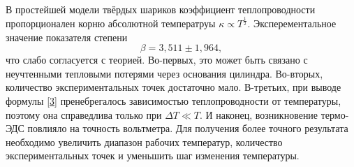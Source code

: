 \documentclass[a4paper, 12pt]{article}
\begin{document}
В простейшей модели твёрдых шариков коэффициент теплопроводности пропорционален корню абсолютной температруы $\kappa \varpropto T^{\frac{1}{2}}$. Эксперементальное значение показателя степени $$\boxed{\beta = 3,511\pm1,964},$$ что слабо согласуется с теорией. Во-первых, это может быть связано с неучтенными тепловыми потерями через основания цилиндра. Во-вторых, количество экспериментальных точек достаточно мало. В-третьих, при выводе формулы \eqref{3} пренебрегалось зависимостью теплопроводности от температуры, поэтому она справедлива только при $\Delta T \ll T$. И наконец, возникновение термо-ЭДС повлияло на точность вольтметра. Для получения более точного результата необходимо увеличить диапазон рабочих температур, количество экспериментальных точек и уменьшить шаг изменения температуры.
\end{document}
